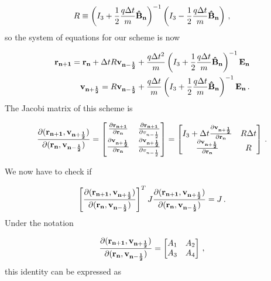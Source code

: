 \documentclass[12pt, class=report, crop=false]{standalone}
\begin{document}
\begin{equation}
  R \equiv \left( I_3 + \frac{1}{2}\frac{q\Delta t}{m} \vb{\hat{B}_n} \right)^{-1} \left( I_3 - \frac{1}{2}\frac{q\Delta t}{m} \vb{\hat{B}_n} \right)\,,
\end{equation}
so the system of equations for our scheme is now

\begin{subequations}
  \begin{align}
    \vb{r_{n+1}} = \vb{r_n} + \Delta t R \vb{v_{n-\frac{1}{2}}} + \frac{q\Delta t^2}{m} \left( I_3 + \frac{1}{2}\frac{q\Delta t}{m} \vb{\hat{B}_n} \right)^{-1} \vb{E_n}\\
    \vb{v_{n+\frac{1}{2}}} = R \vb{v_{n-\frac{1}{2}}} + \frac{q\Delta t}{m} \left( I_3 + \frac{1}{2}\frac{q\Delta t}{m} \vb{\hat{B}_n} \right)^{-1} \vb{E_n}\,.
  \end{align}
\end{subequations}
The Jacobi matrix of this scheme is

\begin{equation}
\label{eq:jacobian}
  \pdv{(\vb{r_{n+1}}, \vb{v_{n+\frac{1}{2}}})}{(\vb{r_n}, \vb{v_{n-\frac{1}{2}}})} =
  \begin{bmatrix}
    \pdv{\vb{r_{n+1}}}{\vb{r_n}} & \pdv{\vb{r_{n+1}}}{v_{n-\frac{1}{2}}}\\
    \pdv{\vb{v_{n+\frac{1}{2}}}}{\vb{r_n}} & \pdv{\vb{v_{n+\frac{1}{2}}}}{v_{n-\frac{1}{2}}}
  \end{bmatrix} =
  \begin{bmatrix}
    I_3 + \Delta t \pdv{\vb{v_{n+\frac{1}{2}}}}{\vb{r_n}} & R \Delta t\\
    \pdv{\vb{v_{n+\frac{1}{2}}}}{\vb{r_n}} & R
  \end{bmatrix}\,.
\end{equation}

We now have to check if

\begin{equation}
  \left[\pdv{(\vb{r_{n+1}}, \vb{v_{n+\frac{1}{2}}})}{(\vb{r_n}, \vb{v_{n-\frac{1}{2}}})}\right]^T J \pdv{(\vb{r_{n+1}}, \vb{v_{n+\frac{1}{2}}})}{(\vb{r_n}, \vb{v_{n-\frac{1}{2}}})} = J\,.
\end{equation}
Under the notation

\begin{equation}
  \pdv{(\vb{r_{n+1}}, \vb{v_{n+\frac{1}{2}}})}{(\vb{r_n}, \vb{v_{n-\frac{1}{2}}})} =
  \begin{bmatrix}
    A_1 & A_2\\
    A_3 & A_4
  \end{bmatrix}\,,
\end{equation}
this identity can be expressed as
\end{document}
